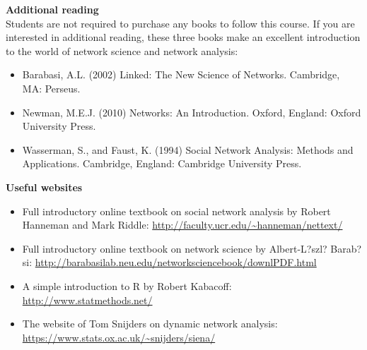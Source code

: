 \documentclass[
]{article}
\providecommand{\tightlist}{%
  \setlength{\itemsep}{0pt}\setlength{\parskip}{0pt}}
\begin{document}
\textbf{Additional reading}\\
Students are not required to purchase any books to follow this course.
If you are interested in additional reading, these three books make an
excellent introduction to the world of network science and network
analysis:

\begin{itemize}
\tightlist
\item
  Barabasi, A.L. (2002) Linked: The New Science of Networks. Cambridge,
  MA: Perseus.\\
\item
  Newman, M.E.J. (2010) Networks: An Introduction. Oxford, England:
  Oxford University Press.\\
\item
  Wasserman, S., and Faust, K. (1994) Social Network Analysis: Methods
  and Applications. Cambridge, England: Cambridge University Press.
\end{itemize}

\textbf{Useful websites}

\begin{itemize}
\tightlist
\item
  Full introductory online textbook on social network analysis by Robert
  Hanneman and Mark Riddle:
  \url{http://faculty.ucr.edu/~hanneman/nettext/}\\
\item
  Full introductory online textbook on network science by Albert-L?szl?
  Barab?si:
  \url{http://barabasilab.neu.edu/networksciencebook/downlPDF.html}\\
\item
  A simple introduction to R by Robert Kabacoff:
  \url{http://www.statmethods.net/}\\
\item
  The website of Tom Snijders on dynamic network analysis:
  \url{https://www.stats.ox.ac.uk/~snijders/siena/}
\end{itemize}
\end{document}
